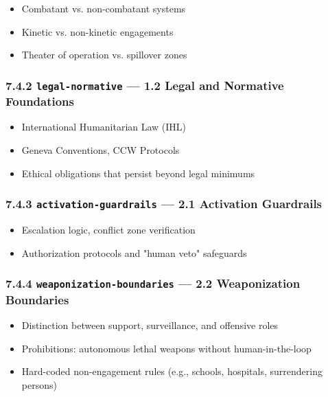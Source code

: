 \documentclass[11pt]{article}
\begin{document}
\begin{itemize}\setlength\itemsep{0pt}
\item Combatant vs. non-combatant systems
\item Kinetic vs. non-kinetic engagements
\item Theater of operation vs. spillover zones
\end{itemize}


\subsubsection*{7.4.2 \texttt{legal-normative} — 1.2 Legal and Normative Foundations}


\begin{itemize}\setlength\itemsep{0pt}
\item International Humanitarian Law (IHL)
\item Geneva Conventions, CCW Protocols
\item Ethical obligations that persist beyond legal minimums
\end{itemize}


\subsubsection*{7.4.3 \texttt{activation-guardrails} — 2.1 Activation Guardrails}


\begin{itemize}\setlength\itemsep{0pt}
\item Escalation logic, conflict zone verification
\item Authorization protocols and "human veto" safeguards
\end{itemize}


\subsubsection*{7.4.4 \texttt{weaponization-boundaries} — 2.2 Weaponization Boundaries}


\begin{itemize}\setlength\itemsep{0pt}
\item Distinction between support, surveillance, and offensive roles
\item Prohibitions: autonomous lethal weapons without human-in-the-loop
\item Hard-coded non-engagement rules (e.g., schools, hospitals, surrendering persons)
\end{itemize}
\end{document}
